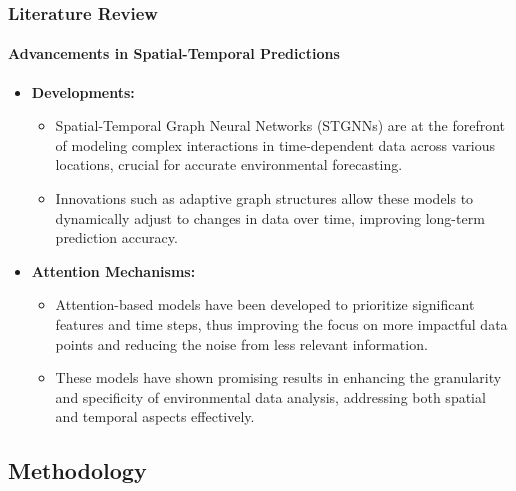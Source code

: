 \documentclass[light]{lutbeamer} %
\begin{document}
\begin{frame}
    \frametitle{Literature Review}
    \framesubtitle{Advancements in Spatial-Temporal Predictions}
    \begin{itemize}
        \item \textbf{Developments:}
              \begin{itemize}
                  \item Spatial-Temporal Graph Neural Networks (STGNNs) are at the forefront of modeling complex interactions in time-dependent data across various locations, crucial for accurate environmental forecasting.
                  \item Innovations such as adaptive graph structures allow these models to dynamically adjust to changes in data over time, improving long-term prediction accuracy.
              \end{itemize}
        \item \textbf{Attention Mechanisms:}
              \begin{itemize}
                  \item Attention-based models have been developed to prioritize significant features and time steps, thus improving the focus on more impactful data points and reducing the noise from less relevant information.
                  \item These models have shown promising results in enhancing the granularity and specificity of environmental data analysis, addressing both spatial and temporal aspects effectively.
              \end{itemize}
    \end{itemize}
\end{frame}

\subsection{Methodology}
\end{document}

